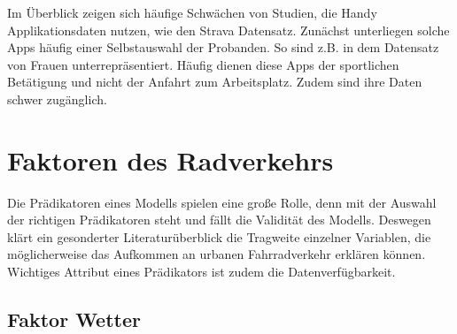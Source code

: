\documentclass[a4paper,12pt]{thesis}
\begin{document}
Im Überblick zeigen sich häufige Schwächen von Studien, die Handy Applikationsdaten nutzen, wie den Strava Datensatz. Zunächst unterliegen solche Apps häufig einer Selbstauswahl der Probanden. So sind z.B. in dem Datensatz von \cite{Alattar2021} Frauen unterrepräsentiert. Häufig dienen diese Apps der sportlichen Betätigung und nicht der Anfahrt zum Arbeitsplatz. Zudem sind ihre Daten schwer zugänglich.


\section{Faktoren des Radverkehrs}

Die Prädikatoren eines Modells spielen eine große Rolle, denn mit der Auswahl der richtigen Prädikatoren steht und fällt die Validität des Modells. Deswegen klärt ein gesonderter Literaturüberblick die Tragweite einzelner Variablen, die möglicherweise das Aufkommen an urbanen Fahrradverkehr erklären können. Wichtiges Attribut eines Prädikators ist zudem die Datenverfügbarkeit. 

\subsection{Faktor Wetter}
\end{document}
